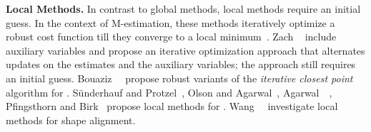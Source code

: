 {\bf Local Methods.} In contrast to global methods, local methods require an initial guess. 
In the context of M-estimation, these methods iteratively optimize a robust cost function till they converge to a local minimum~\cite{Bosse17fnt}.
 Zach \etal~\cite{Zach14eccv} include auxiliary variables and propose an 
 iterative  optimization approach that alternates updates on the estimates and the auxiliary variables; 
 the approach still requires an initial guess.
Bouaziz~\etal~\cite{Bouaziz13acmsig-sparseICP} propose  
robust variants of the \emph{iterative closest point} algorithm for \PCR. 
S\"{u}nderhauf and Protzel~\cite{Sunderhauf12iros}, Olson and Agarwal~\cite{Olson12rss}, Agarwal~\etal~\cite{Agarwal13icra}, Pfingsthorn and Birk~\cite{Pfingsthorn16ijrr}
 propose local methods for \PGO. 
 Wang~\etal~\cite{Wang14cvpr-robustShapeEstimationL1} 
 investigate local methods for shape alignment.
